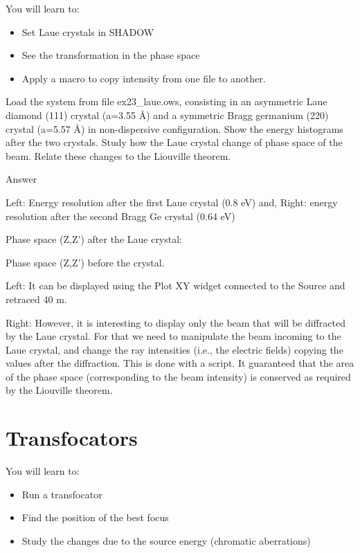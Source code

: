 \documentclass[]{article}
\providecommand{\tightlist}{%
  \setlength{\itemsep}{0pt}\setlength{\parskip}{0pt}}
\begin{document}
You will learn to:

\begin{itemize}
\tightlist
\item
  Set Laue crystals in SHADOW
\item
  See the transformation in the phase space
\item
  Apply a macro to copy intensity from one file to another.
\end{itemize}

Load the system from file ex23\_laue.ows, consisting in an asymmetric
Laue diamond (111) crystal (a=3.55 Å) and a symmetric Bragg germanium
(220) crystal (a=5.57 Å) in non-dispersive configuration. Show the
energy histograms after the two crystals. Study how the Laue crystal
change of phase space of the beam. Relate these changes to the Liouville
theorem.

Answer

Left: Energy resolution after the first Laue crystal (0.8 eV) and,
Right: energy resolution after the second Bragg Ge crystal (0.64 eV)

Phase space (Z,Z') after the Laue crystal:

Phase space (Z,Z') before the crystal.

Left: It can be displayed using the Plot XY widget connected to the
Source and retraced 40 m.

Right: However, it is interesting to display only the beam that will be
diffracted by the Laue crystal. For that we need to manipulate the beam
incoming to the Laue crystal, and change the ray intensities (i.e., the
electric fields) copying the values after the diffraction. This is done
with a script. It guaranteed that the area of the phase space
(corresponding to the beam intensity) is conserved as required by the
Liouville theorem.

\section{Transfocators}\label{transfocators}

You will learn to:

\begin{itemize}
\tightlist
\item
  Run a transfocator
\item
  Find the position of the best focus
\item
  Study the changes due to the source energy (chromatic aberrations)
\end{itemize}
\end{document}
